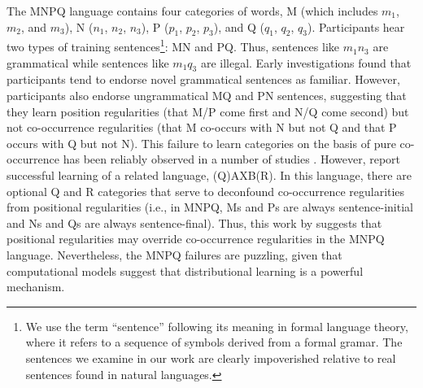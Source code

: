 \documentclass[man,floatsintext]{apa6}
\begin{document}
The MNPQ language contains four categories of words, M (which includes $m_1$, $m_2$, and $m_3$), N ($n_1$, $n_2$, $n_3$), P ($p_1$, $p_2$, $p_3$), and Q ($q_1$, $q_2$, $q_3$). Participants hear two types of training sentences\footnote{ We use the term ``sentence'' following its meaning in formal language theory, where it refers to a sequence of symbols derived from a formal gramar. The sentences we examine in our work are clearly impoverished relative to real sentences found in natural languages.}: MN and PQ. Thus, sentences like $m_1 n_3$ are grammatical while sentences like $m_1 q_3$ are illegal. Early investigations \citep{braine1966, smith1966} found that participants tend to endorse novel grammatical sentences as familiar. However, participants also endorse ungrammatical MQ and PN sentences, suggesting that they learn position regularities (that M/P come first and N/Q come second) but not co-occurrence regularities (that M co-occurs with N but not Q and that P occurs with Q but not N). This failure to learn categories on the basis of pure co-occurrence has been reliably observed in a number of studies \citep{braine1987, brooks1993, frigo1998, kempe2001, gerken2005, lany2010, frank2011}. However, \citet[Experiment 5]{reeder2009} report successful learning of a related language, (Q)AXB(R). In this language, there are optional Q and R categories that serve to deconfound co-occurrence regularities from positional regularities (i.e., in MNPQ, Ms and Ps are always sentence-initial and Ns and Qs are always sentence-final). Thus, this work by \citeauthor{reeder2009} suggests that positional regularities may override co-occurrence regularities in the MNPQ language. Nevertheless, the MNPQ failures are puzzling, given that computational models suggest that distributional learning is a powerful mechanism.
\end{document}
